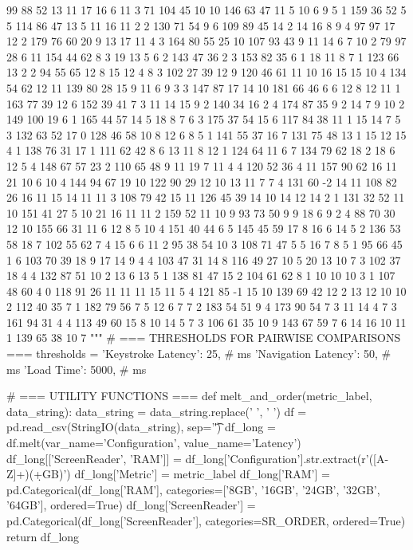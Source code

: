 \begin{pyverbatim}
{	99	88	52	13	11	17	16	6	11	3	71	104	45	10	10
	146	63	47	11	5	10	6	9	5	1	159	36	52	5	5
	114	86	47	13	5	11	16	11	2	2	130	71	54	9	6
	109	89	45	14	2	14	16	8	9	4	97	97	17	12	2
	179	76	60	20	9	13	17	11	4	3	164	80	55	25	10
	107	93	43	9	11	14	6	7	10	2	79	97	28	6	11
	154	44	62	8	3	19	13	5	6	2	143	47	36	2	3
	153	82	35	6	1	18	11	8	7	1	123	66	13	2	2
	94	55	65	12	8	15	12	4	8	3	102	27	39	12	9
	120	46	61	11	10	16	15	15	10	4	134	54	62	12	11
	139	80	28	15	9	11	6	9	3	3	147	87	17	14	10
	181	66	46	6	6	12	8	12	11	1	163	77	39	12	6
	152	39	41	7	3	11	14	15	9	2	140	34	16	2	4
	174	87	35	9	2	14	7	9	10	2	149	100	19	6	1
	165	44	57	14	5	18	8	7	6	3	175	37	54	15	6
	117	84	38	11	1	15	14	7	5	3	132	63	52	17	0
	128	46	58	10	8	12	6	8	5	1	141	55	37	16	7
	131	75	48	13	1	15	12	15	4	1	138	76	31	17	1
	111	62	42	8	6	13	11	8	12	1	124	64	11	6	7
	134	79	62	18	2	18	6	12	5	4	148	67	57	23	2
	110	65	48	9	11	19	7	11	4	4	120	52	36	4	11
	157	90	62	16	11	21	10	6	10	4	144	94	67	19	10
	122	90	29	12	10	13	11	7	7	4	131	60	-2	14	11
	108	82	26	16	11	15	14	11	11	3	108	79	42	15	11
	126	45	39	14	10	14	12	14	2	1	131	32	52	11	10
	151	41	27	5	10	21	16	11	11	2	159	52	11	10	9
	93	73	50	9	9	18	6	9	2	4	88	70	30	12	10
	155	66	31	11	6	12	8	5	10	4	151	40	44	6	5
	145	45	59	17	8	16	6	14	5	2	136	53	58	18	7
	102	55	62	7	4	15	6	6	11	2	95	38	54	10	3
	108	71	47	5	5	16	7	8	5	1	95	66	45	1	6
	103	70	39	18	9	17	14	9	4	4	103	47	31	14	8
	116	49	27	10	5	20	13	10	7	3	102	37	18	4	4
	132	87	51	10	2	13	6	13	5	1	138	81	47	15	2
	104	61	62	8	1	10	10	10	3	1	107	48	60	4	0
	118	91	26	11	11	11	15	11	5	4	121	85	-1	15	10
	139	69	42	12	2	13	12	10	10	2	112	40	35	7	1
	182	79	56	7	5	12	6	7	7	2	183	54	51	9	4
	173	90	54	7	3	11	14	4	7	3	161	94	31	4	4
	113	49	60	15	8	10	14	5	7	3	106	61	35	10	9
	143	67	59	7	6	14	16	10	11	1	139	65	38	10	7
	"""
	}
	# === THRESHOLDS FOR PAIRWISE COMPARISONS ===
	thresholds = {
	'Keystroke Latency': 25,  # ms
	'Navigation Latency': 50,  # ms
	'Load Time': 5000,  # ms
	}

	# === UTILITY FUNCTIONS ===
	def melt_and_order(metric_label, data_string):
	data_string = data_string.replace(' ', ' ')
	df = pd.read_csv(StringIO(data_string), sep='\t')
	df_long = df.melt(var_name='Configuration', value_name='Latency')
	df_long[['ScreenReader', 'RAM']] = df_long['Configuration'].str.extract(r'([A-Z]+)(\d+GB)')
	df_long['Metric'] = metric_label
	df_long['RAM'] = pd.Categorical(df_long['RAM'], categories=['8GB', '16GB', '24GB', '32GB', '64GB'], ordered=True)
	df_long['ScreenReader'] = pd.Categorical(df_long['ScreenReader'], categories=SR_ORDER, ordered=True)
	return df_long


\end{pyverbatim}

